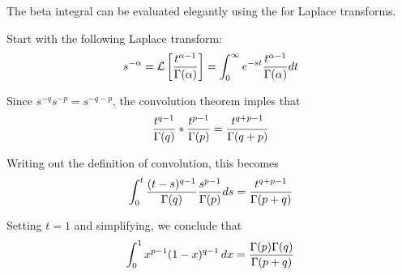 \documentclass[12pt]{article}
\begin{document}
The beta integral can be evaluated elegantly using the  for Laplace transforms.

Start with the following Laplace transform:
\[
s^{-\alpha} = {\cal L} \left[ {t^{\alpha - 1} \over \Gamma(\alpha)} \right] = \int_0^\infty e^{-st} {t^{\alpha - 1} \over \Gamma(\alpha)} dt
\]

Since $s^{-q} s^{-p} = s^{-q - p}$, the convolution theorem imples that
\[
{t^{q - 1} \over \Gamma(q)} *  {t^{p - 1} \over \Gamma(p)} =  {t^{q + p - 1} \over \Gamma(q + p)}
\]

Writing out the definition of convolution, this becomes
\[
\int_0^t {(t-s)^{q - 1} \over \Gamma(q)} {s^{p - 1} \over \Gamma(p)} ds = {t^{q + p - 1} \over \Gamma(p + q)}
\]

Setting $t=1$ and simplifying, we conclude that
\[
\int_0^1 x^{p - 1} (1-x)^{q - 1}  \,dx= {\Gamma(p) \Gamma(q)  \over \Gamma(p + q)}
\]

\end{document}
